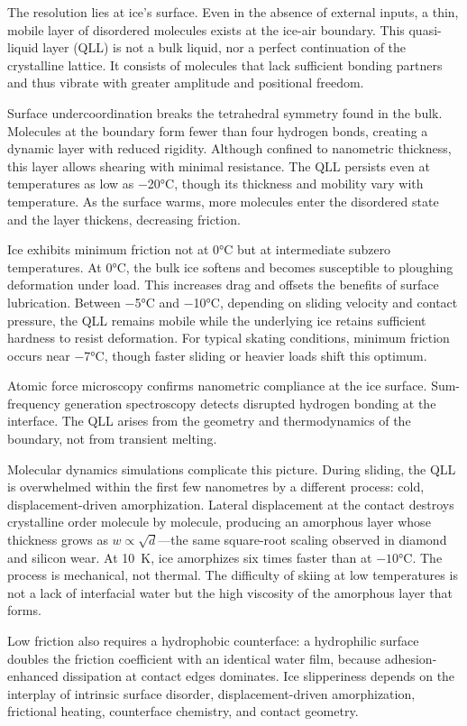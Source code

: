 The resolution lies at ice's surface. Even in the absence of external inputs, a thin, mobile layer of disordered molecules exists at the ice-air boundary. This quasi-liquid layer (QLL) is not a bulk liquid, nor a perfect continuation of the crystalline lattice. It consists of molecules that lack sufficient bonding partners and thus vibrate with greater amplitude and positional freedom.

Surface undercoordination breaks the tetrahedral symmetry found in the bulk. Molecules at the boundary form fewer than four hydrogen bonds, creating a dynamic layer with reduced rigidity. Although confined to nanometric thickness, this layer allows shearing with minimal resistance. The QLL persists even at temperatures as low as −20°C, though its thickness and mobility vary with temperature. As the surface warms, more molecules enter the disordered state and the layer thickens, decreasing friction.

Ice exhibits minimum friction not at 0°C but at intermediate subzero temperatures. At 0°C, the bulk ice softens and becomes susceptible to ploughing deformation under load. This increases drag and offsets the benefits of surface lubrication. Between −5°C and −10°C, depending on sliding velocity and contact pressure, the QLL remains mobile while the underlying ice retains sufficient hardness to resist deformation. For typical skating conditions, minimum friction occurs near −7°C, though faster sliding or heavier loads shift this optimum.

Atomic force microscopy confirms nanometric compliance at the ice surface. Sum-frequency generation spectroscopy detects disrupted hydrogen bonding at the interface. The QLL arises from the geometry and thermodynamics of the boundary, not from transient melting.

Molecular dynamics simulations complicate this picture. During sliding, the QLL is overwhelmed within the first few nanometres by a different process: cold, displacement-driven amorphization. Lateral displacement at the contact destroys crystalline order molecule by molecule, producing an amorphous layer whose thickness grows as $w \propto \sqrt{d}$—the same square-root scaling observed in diamond and silicon wear. At 10~K, ice amorphizes six times faster than at $-10$°C. The process is mechanical, not thermal. The difficulty of skiing at low temperatures is not a lack of interfacial water but the high viscosity of the amorphous layer that forms.

Low friction also requires a hydrophobic counterface: a hydrophilic surface doubles the friction coefficient with an identical water film, because adhesion-enhanced dissipation at contact edges dominates. Ice slipperiness depends on the interplay of intrinsic surface disorder, displacement-driven amorphization, frictional heating, counterface chemistry, and contact geometry.


